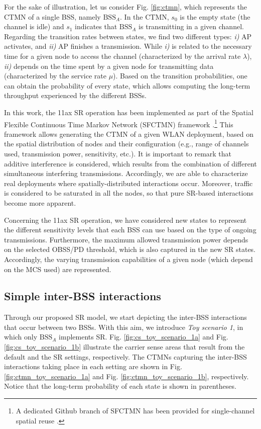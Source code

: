 \documentclass{ieeeaccess}
\begin{document}
For the sake of illustration, let us consider Fig. \ref{fig:ctmn}, which represents the CTMN of a single BSS, namely $\text{BSS}_A$. In the CTMN, $s_0$ is the empty state (the channel is idle) and $s_1$ indicates that $\text{BSS}_A$ is transmitting in a given channel. Regarding the transition rates between states, we find two different types: \emph{i)} AP activates, and \emph{ii)} AP finishes a transmission. While \emph{i)} is related to the necessary time for a given node to access the channel (characterized by the arrival rate $\lambda$), \emph{ii)} depends on the time spent by a given node for transmitting data (characterized by the service rate $\mu$). Based on the transition probabilities, one can obtain the probability of every state, which allows computing the long-term throughput experienced by the different BSSs.

In this work, the 11ax SR operation has been implemented as part of the Spatial Flexible Continuous Time Markov Network (SFCTMN) framework \cite{barrachina2019dynamic, barrachina2019overlap, wilhelmi2019potential}.\footnote{A dedicated Github branch of SFCTMN has been provided for single-channel spatial reuse \cite{wilhelmi2019sfctm_spatial_reuse}.} This framework allows generating the CTMN of a given WLAN deployment, based on the spatial distribution of nodes and their configuration (e.g., range of channels used, transmission power, sensitivity, etc.). It is important to remark that additive interference is considered, which results from the combination of different simultaneous interfering transmissions. Accordingly, we are able to characterize real deployments where spatially-distributed interactions occur. Moreover, traffic is considered to be saturated in all the nodes, so that pure SR-based interactions become more apparent.

Concerning the 11ax SR operation, we have considered new states to represent the different sensitivity levels that each BSS can use based on the type of ongoing transmissions. Furthermore, the maximum allowed transmission power depends on the selected OBSS/PD threshold, which is also captured in the new SR states. Accordingly, the varying transmission capabilities of a given node (which depend on the MCS used) are represented.

\subsection{Simple inter-BSS interactions}
\label{section:simple_interactions}
Through our proposed SR model, we start depicting the inter-BSS interactions that occur between two BSSs. With this aim, we introduce \emph{Toy scenario 1}, in which only $\text{BSS}_A$ implements SR. Fig. \ref{fig:cs_toy_scenario_1a} and Fig. \ref{fig:cs_toy_scenario_1b} illustrate the carrier sense areas that result from the default and the SR settings, respectively. The CTMNs capturing the inter-BSS interactions taking place in each setting are shown in Fig. \ref{fig:ctmn_toy_scenario_1a} and Fig. \ref{fig:ctmn_toy_scenario_1b}, respectively. Notice that the long-term probability of each state is shown in parentheses.
\end{document}
